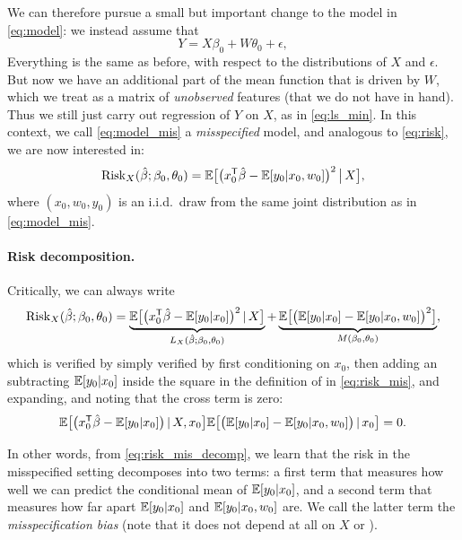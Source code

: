 \documentclass{article}
\begin{document}
We can therefore pursue a small but important change to the model in
\eqref{eq:model}: we instead assume that   
\begin{equation}
\label{eq:model_mis}
Y = X\beta_0 + W\theta_0 + \epsilon,
\end{equation}
Everything is the same as before, with respect to the distributions of $X$ and
$\epsilon$. But now we have an additional part of the mean function that is
driven by $W$, which we treat as a matrix of \emph{unobserved} features (that we 
do not have in hand). Thus we still just carry out regression of $Y$ on $X$, as
in \eqref{eq:ls_min}. In this context, we call \eqref{eq:model_mis} a
\emph{misspecified} model, and analogous to \eqref{eq:risk}, we are now
interested in:
\begin{equation}
\label{eq:risk_mis}
\mathrm{Risk}_X(\hat{\beta}; \beta_0, \theta_0) = \mathbb{E} \big[ \big( x_0^{\mathsf{T}} \hat{\beta} -
\mathbb{E}[y_0|x_0,w_0] \big)^2 \,\big|\, X \big],
\end{equation}
where $(x_0,w_0,y_0)$ is an i.i.d.\ draw from the same joint distribution as in 
\eqref{eq:model_mis}. 

\paragraph{Risk decomposition.} 

Critically, we can always write 
\begin{equation}
\label{eq:risk_mis_decomp}
\mathrm{Risk}_X(\hat{\beta}; \beta_0, \theta_0) = 
\underbrace{\mathbb{E} \big[ \big( x_0^{\mathsf{T}} \hat{\beta} - \mathbb{E}[y_0|x_0] \big)^2 \,|\, X 
  \big]}_{L_X(\hat{\beta}; \beta_0, \theta_0)} +
\underbrace{\mathbb{E} \big[ \big( \mathbb{E}[y_0|x_0] - \mathbb{E}[y_0|x_0,w_0] \big)^2
  \big]}_{M(\beta_0, \theta_0)}, 
\end{equation}
which is verified by simply verified by first conditioning on $x_0$, then adding
an subtracting $\mathbb{E}[y_0|x_0]$ inside the square in the definition of
 in \eqref{eq:risk_mis}, and expanding, 
and noting that the cross term is zero:   
\[
\mathbb{E} \big[ \big( x_0^{\mathsf{T}} \hat{\beta} - \mathbb{E}[y_0|x_0] \big) \,|\, X,x_0 \big]
\mathbb{E} \big[\big( \mathbb{E}[y_0|x_0] - \mathbb{E}[y_0|x_0,w_0] \big) \,|\, x_0 \big] = 0.
\]

In other words, from \eqref{eq:risk_mis_decomp}, we learn that the risk in the
misspecified setting decomposes into two terms: a first term  that measures how well we can predict the conditional mean
of $\mathbb{E}[y_0|x_0]$, and a second term 
that measures how far apart $\mathbb{E}[y_0|x_0]$ and $\mathbb{E}[y_0|x_0,w_0]$ are. We call the
latter term the \emph{misspecification bias} (note that it does not depend at
all on $X$ or \smash{$\hbeta$}).  
\end{document}
